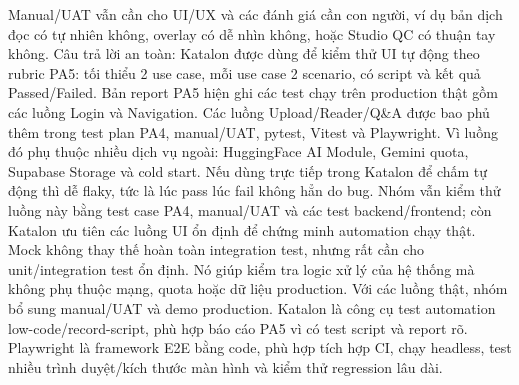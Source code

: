 {}Manual/UAT vẫn cần cho UI/UX và các đánh giá cần con người, ví dụ bản dịch đọc có tự nhiên không, overlay có dễ nhìn không, hoặc Studio QC có thuận tay không.\markdownRendererInterblockSeparator
{}
\markdownRendererSectionEnd \markdownRendererSectionBegin
{}\markdownRendererInterblockSeparator
{}Câu trả lời an toàn:\markdownRendererParagraphSeparator
{}Katalon được dùng để kiểm thử UI tự động theo rubric PA5: tối thiểu 2 use case, mỗi use case 2 scenario, có script và kết quả Passed/Failed.\markdownRendererParagraphSeparator
{}Bản report PA5 hiện ghi các test chạy trên production thật gồm các luồng Login và Navigation. Các luồng Upload/Reader/Q&A được bao phủ thêm trong test plan PA4, manual/UAT, pytest, Vitest và Playwright.\markdownRendererInterblockSeparator
{}
\markdownRendererSectionEnd \markdownRendererSectionBegin
{}\markdownRendererInterblockSeparator
{}Vì luồng đó phụ thuộc nhiều dịch vụ ngoài: HuggingFace AI Module, Gemini quota, Supabase Storage và cold start. Nếu dùng trực tiếp trong Katalon để chấm tự động thì dễ flaky, tức là lúc pass lúc fail không hẳn do bug.\markdownRendererParagraphSeparator
{}Nhóm vẫn kiểm thử luồng này bằng test case PA4, manual/UAT và các test backend/frontend; còn Katalon ưu tiên các luồng UI ổn định để chứng minh automation chạy thật.\markdownRendererInterblockSeparator
{}
\markdownRendererSectionEnd \markdownRendererSectionBegin
{}\markdownRendererInterblockSeparator
{}Mock không thay thế hoàn toàn integration test, nhưng rất cần cho unit/integration test ổn định.\markdownRendererParagraphSeparator
{}Nó giúp kiểm tra logic xử lý của hệ thống mà không phụ thuộc mạng, quota hoặc dữ liệu production. Với các luồng thật, nhóm bổ sung manual/UAT và demo production.\markdownRendererInterblockSeparator
{}
\markdownRendererSectionEnd \markdownRendererSectionBegin
{}\markdownRendererInterblockSeparator
{}Katalon là công cụ test automation low-code/record-script, phù hợp báo cáo PA5 vì có test script và report rõ.\markdownRendererParagraphSeparator
{}Playwright là framework E2E bằng code, phù hợp tích hợp CI, chạy headless, test nhiều trình duyệt/kích thước màn hình và kiểm thử regression lâu dài.\markdownRendererInterblockSeparator
{}
\markdownRendererSectionEnd \markdownRendererSectionBegin
{}\markdownRendererInterblockSeparator
